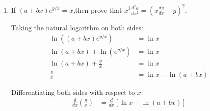 \begin{enumerate}[label=\thesubsection.\arabic*, ref=\thesubsection.\theenumi]
Evaluating the dot product in the numerator:
\begin{align*}
	\vec{a} \cdot (\vec{b} + \vec{c}) &= (\vec{i} + \vec{j} + \vec{k}) \cdot \left[ (\lambda + 2)\vec{i} + 6\vec{j} - 2\vec{k} \right] = \lambda + 6
\end{align*}

Substituting into the equation:
\begin{align*}
	\frac{\lambda + 6}{\sqrt{(\lambda + 2)^2 + 40}} = 1 \implies \lambda + 6 = \sqrt{(\lambda + 2)^2 + 40}
\end{align*}

Squaring both sides (with $\lambda + 6 > 0$):
\begin{align*}
	(\lambda + 6)^2 &= (\lambda + 2)^2 + 40 \\
	\lambda^2 + 12\lambda + 36 &= (\lambda^2 + 4\lambda + 4) + 40 \\
	8\lambda &= 8 \implies
	\lambda = 1
\end{align*}

Substitute $\lambda = 1$ back into $\vec{b} + \vec{c}$:
\begin{align*}
	\vec{b} + \vec{c} &= (1 + 2)\vec{i} + 6\vec{j} - 2\vec{k} = 3\vec{i} + 6\vec{j} - 2\vec{k}\\
	|\vec{b} + \vec{c}| &= \sqrt{3^2 + 6^2 + (-2)^2} = \sqrt{9 + 36 + 4} = \sqrt{49} = 7
\end{align*}

Therefore, the unit vector along $\vec{b} + \vec{c}$ is:
\begin{align*}
	\vec{u} = \frac{3\vec{i} + 6\vec{j} - 2\vec{k}}{7} = \frac{3}{7}\vec{i} + \frac{6}{7}\vec{j} - \frac{2}{7}\vec{k}
\end{align*}



\item If $(a+bx)e^{y/x}=x$,then prove that $x^3\frac{d^2y}{dx^2}=\left(x\frac{dy}{dx}-y\right)^2$.

\solution
Taking the natural logarithm on both sides:
\begin{align*}
	\ln\left((a+bx)e^{y/x}\right) &= \ln x \\
	\ln(a+bx) + \ln\left(e^{y/x}\right) &= \ln x \\
	\ln(a+bx) + \frac{y}{x} &= \ln x \\
	\frac{y}{x} &= \ln x - \ln(a+bx)
\end{align*}

Differentiating both sides with respect to $x$:
\begin{align*}
	\frac{d}{dx}\left(\frac{y}{x}\right) &= \frac{d}{dx}\left[\ln x - \ln(a+bx)\right]
\end{align*}


\end{enumerate}
